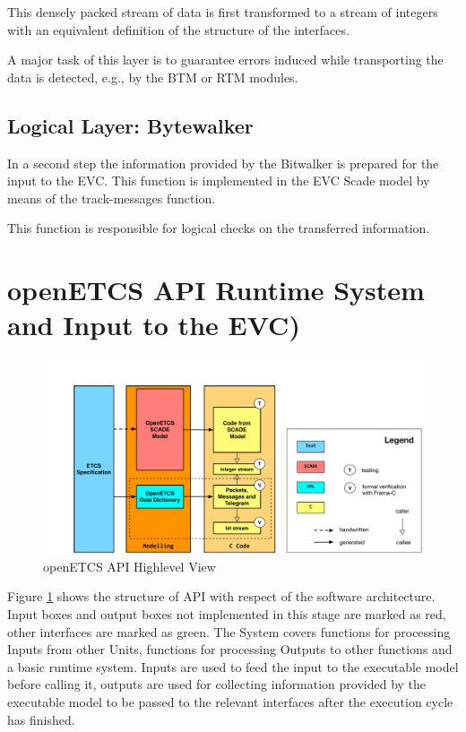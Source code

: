 \documentclass{template/openetcs_report}
\begin{document}
This densely packed stream of data is first transformed to a stream of integers with an equivalent definition of the structure of the interfaces.

A major task of this layer is to guarantee errors induced while transporting the data is detected, e.g., by the BTM or RTM modules.

\subsection{Logical Layer: Bytewalker}

In a second step the information provided by the Bitwalker is prepared for the input to the EVC. This function is implemented in the EVC Scade model by means of the track-messages function.

This function is responsible for logical checks on the transferred information.


\section{openETCS \gls{API} Runtime System and Input to the EVC)}
\label{chp_openETCS_API}

\begin{figure}[hbtp]
\centering
\includegraphics[width=\linewidth]{OpenETCS-Stack.pdf}
\caption{openETCS API Highlevel View}
\label{fig:apiHighLevel}
\end{figure}

Figure \ref{fig:apiHighLevel} shows the structure of API with respect of the software architecture. Input boxes and output boxes not implemented in this stage are marked as red, other interfaces are marked as green. The System covers functions for processing Inputs from other Units, functions for processing Outputs to other functions and a basic runtime system. Inputs are used to feed the input to the executable model before calling it, outputs are used for collecting information provided by the executable model to be passed to the relevant interfaces after the execution cycle has finished.
\end{document}
